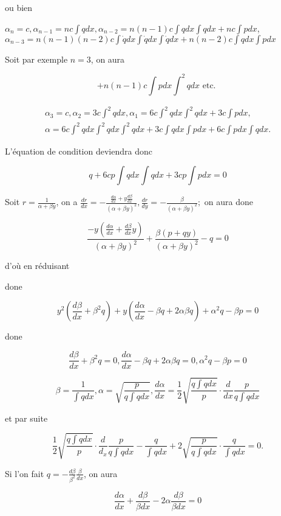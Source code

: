 \documentclass{article}
\begin{document}
ou bien

\(\alpha_{n}=c, \alpha_{n-1}=n c \int q d x, \alpha_{n-2}=n(n-1) c \int q d x \int q d x+n c \int p d x\),
\(\alpha_{n-3}=n(n-1)(n-2) c \int \dot{q} d x \int \dot{q} d x \int \dot{q} d x+n(n-2) c \int q d x \int p d x\)

Soit par exemple \(n=3\), on aura

\[
+n(n-1) c \int p d x \int^{2} q d x \text { etc. }
\]

\[
\begin{gathered}
\alpha_{3}=c, \alpha_{2}=3 c \int^{2} q d x, \alpha_{1}=6 c \int^{2} q d x \int^{2} q d x+3 c \int p d x, \\
\alpha=6 c \int^{2} q d x \int^{2} q d x \int^{2} q d x+3 c \int q d x \int p d x+6 c \int p d x \int q d x .
\end{gathered}
\]

L'équation de condition deviendra donc

\[
q+6 c p \int q d x \int q d x+3 c p \int p d x=0
\]

Soit \(r=\frac{1}{\alpha+\beta y}\), on a \(\frac{d r}{d x}=-\frac{\frac{d \alpha}{d x}+y \frac{d \beta}{d x}}{(\alpha+\beta y)^{2}}, \frac{d r}{d y}=-\frac{\beta}{(\alpha+\beta y)^{2}} ;\) on aura done

\[
\frac{-y\left(\frac{d \alpha}{d x}+\frac{d \beta}{d x} y\right)}{(\alpha+\beta y)^{2}}+\frac{\beta(p+q y)}{(\alpha+\beta y)^{2}}-q=0
\]

d'où en réduisant

done

\[
y^{2}\left(\frac{d \beta}{d x}+\beta^{2} q\right)+y\left(\frac{d \alpha}{d x}-\beta q+2 \alpha \beta q\right)+\alpha^{2} q-\beta p=0
\]

done

\[
\frac{d \beta}{d x}+\beta^{2} q=0, \frac{d \alpha}{d x}-\beta q+2 \alpha \beta q=0, \alpha^{2} q-\beta p=0
\]

\[
\beta=\frac{1}{\int q d x}, \alpha=\sqrt{\frac{p}{q \int q d x}}, \frac{d \alpha}{d x}=\frac{1}{2} \sqrt{\frac{q \int q d x}{p}} \cdot \frac{d}{d x} \frac{p}{q \int q d x}
\]

et par suite

\[
\frac{1}{2} \sqrt{\frac{q \int q d x}{p}} \cdot \frac{d}{d_{x}} \frac{p}{q \int q d x}-\frac{q}{\int q d x}+2 \sqrt{\frac{p}{q \int q d x}} \cdot \frac{q}{\int q d x}=0 .
\]

Si l'on fait \(q=-\frac{d \beta}{\beta^{2}} \frac{\beta}{d x}\), on aura

\[
\frac{d \alpha}{d x}+\frac{d \beta}{\beta d x}-2 \alpha \frac{d \beta}{\beta d x}=0
\]
\end{document}
